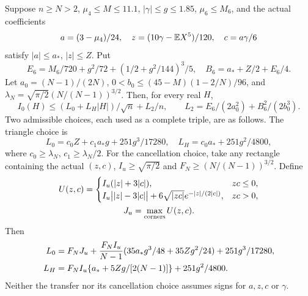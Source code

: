 \begin{lemma}\label{fourier:early-low}
\label{fourier:paired-low}\label{entryleap:fourier-transfer}
Suppose $n\ge N>2$, $\mu_4\le M\le11.1$, $|\gamma|\le g\le1.85$,
$\mu_6\le M_6$, and the actual coefficients
\[
 a=(3-\mu_4)/24,\quad z=(10\gamma-\mathbb E X^5)/120,\quad c=a\gamma/6
\]
satisfy $|a|\le a_*$, $|z|\le Z$. Put
\begin{equation}\label{fourier:taylor}
 E_6=M_6/720+g^2/72+(1/2+g^2/144)^3/5,\quad
 B_6=a_*+Z/2+E_6/4.
\end{equation}
Let $a_0=(N-1)/(2N)$,
$0<b_0\le(45-M)(1-2/N)/96$, and
$\lambda_N=\sqrt{\pi/2}(N/(N-1))^{3/2}$.
Then, for every real $H$,
\begin{equation}\label{fourier:low-form}
 I_0(H)\le(L_0+L_H|H|)/\sqrt n+L_2/n,
 \qquad L_2=E_6/(2a_0^2)+B_6^2/(2b_0^3).
\end{equation}
Two admissible choices, each used as a complete triple, are as follows.
The triangle choice is
\begin{equation}\label{fourier:early}
 L_0=c_0Z+c_1a_*g+251g^3/17280,\quad
 L_H=c_0a_*+251g^2/4800,
\end{equation}
where $c_0\ge\lambda_N$, $c_1\ge\lambda_N/2$.
For the cancellation choice, take any rectangle containing the actual
$(z,c)$, $I_u\ge\sqrt{\pi/2}$ and $F_N\ge(N/(N-1))^{3/2}$. Define
\begin{gather*}
 U(z,c)=\begin{cases}
 I_u(|z|+3|c|),&zc\le0,\\
 I_u\bigl||z|-3|c|\bigr|+6\sqrt{|zc|}e^{-|z|/(2|c|)},&zc>0,
 \end{cases}\\
 J_u=\max_{\rm corners}U(z,c).
\end{gather*}
Then
\begin{align}\label{fourier:paired}
 L_0&=F_NJ_u+\frac{F_NI_u}{N-1}
 (35a_*g^3/48+35Zg^2/24)+251g^3/17280,\notag\\
 L_H&=F_NI_u\{a_*+5Zg/[2(N-1)]\}+251g^2/4800.
\end{align}
Neither the transfer nor its cancellation choice assumes signs for
$a,z,c$ or $\gamma$.
\end{lemma}
